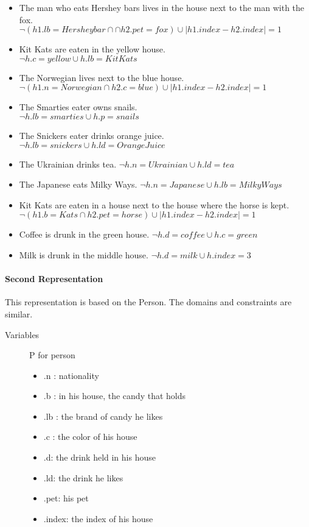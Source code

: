 \begin{description}
\begin{itemize}
  \item The man who eats Hershey bars lives in the house next to the man with the fox.\\
    $\neg (h1.lb=Hersheybar \cap \cap h2.pet = fox) \cup | h1.index-h2.index | = 1$
  \item Kit Kats are eaten in the yellow house.\\
    $\neg h.c=yellow \cup h.lb = KitKats$
  \item The Norwegian lives next to the blue house.\\
    $\neg (h1.n=Norwegian \cap h2.c = blue) \cup | h1.index - h2.index |=1$
  \item The Smarties eater owns snails.\\
    $\neg h.lb=smarties \cup h.p = snails$
  \item The Snickers eater drinks orange juice.\\
    $\neg h.lb=snickers \cup h.ld = OrangeJuice$
  \item The Ukrainian drinks tea.
    $\neg h.n=Ukrainian \cup h.ld=tea$
  \item The Japanese eats Milky Ways.
    $\neg h.n=Japanese \cup h.lb=MilkyWays$
  \item Kit Kats are eaten in a house next to the house where the horse is kept.
    $\neg (h1.b=Kats \cap h2.pet=horse) \cup |h1.index-h2.index|=1$
  \item Coffee is drunk in the green house.
    $\neg h.d=coffee \cup h.c=green$
  \item Milk is drunk in the middle house.
    $\neg h.d=milk \cup h.index=3$
  \end{itemize}
\end{description}

\paragraph{Second Representation}
This representation is based on the Person.  The domains and
constraints are similar.

\begin{description}
\item [Variables] P for person
  \begin{itemize}
  \item .n : nationality
  \item .b : in his house, the candy that holds
  \item .lb : the brand of candy he likes
  \item .c : the color of his house
  \item .d: the drink held in his house
  \item .ld: the drink he likes
  \item .pet: his pet
  \item .index: the index of his house
  \end{itemize}
  
\end{description}

